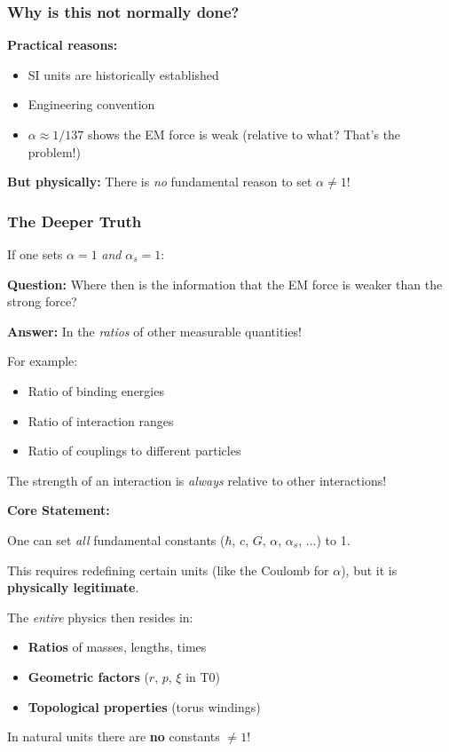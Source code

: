 \subsubsection{Why is this not normally done?}

\textbf{Practical reasons:}
\begin{itemize}[nosep]
	\item SI units are historically established
	\item Engineering convention
	\item $\alpha \approx 1/137$ shows the EM force is weak (relative to what? That's the problem!)
\end{itemize}

\textbf{But physically:} There is \textit{no} fundamental reason to set $\alpha \neq 1$!

\subsubsection{The Deeper Truth}

If one sets $\alpha = 1$ \textit{and} $\alpha_s = 1$:

\textbf{Question:} Where then is the information that the EM force is weaker than the strong force?

\textbf{Answer:} In the \textit{ratios} of other measurable quantities!

For example:
\begin{itemize}[nosep]
	\item Ratio of binding energies
	\item Ratio of interaction ranges
	\item Ratio of couplings to different particles
\end{itemize}

The strength of an interaction is \textit{always} relative to other interactions!

\begin{keypoint}
	\textbf{Core Statement:}
	
	One can set \textit{all} fundamental constants ($\hbar$, $c$, $G$, $\alpha$, $\alpha_s$, ...) to 1.
	
	This requires redefining certain units (like the Coulomb for $\alpha$), but it is \textbf{physically legitimate}.
	
	The \textit{entire} physics then resides in:
	\begin{itemize}[nosep]
		\item \textbf{Ratios} of masses, lengths, times
		\item \textbf{Geometric factors} ($r$, $p$, $\xi$ in T0)
		\item \textbf{Topological properties} (torus windings)
	\end{itemize}
	
	In natural units there are \textbf{no} constants $\neq 1$!
\end{keypoint}

